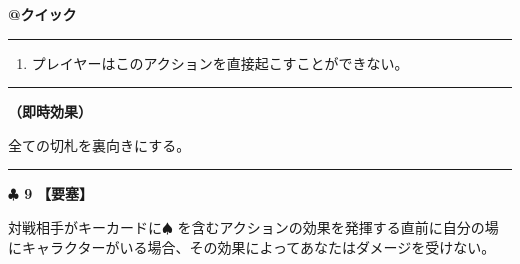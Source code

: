 \documentclass[twocolumn,a5paper,papersize,10pt]{jarticle}
\begin{document}
\vspace{-1zh}
\begin{tcolorbox}[title={\small\bf【Action】切札リセット}{\scriptsize （誘発）}]

{\scriptsize\bf @クイック }

\vspace{1mm} %
\hrule height 0.1mm depth 0mm width 62mm %
\vspace{1mm} %


\vspace{-1zh}%
\begin{enumerate}
\renewcommand{\labelenumi}{※}
\setlength{\leftskip}{-0.3cm}
\setlength{\itemsep}{0pt} %
\setlength{\parskip}{0pt} %

\item プレイヤーはこのアクションを直接起こすことができない。

\vspace{-3mm}%
\end{enumerate}
\vspace{-2mm} %
\vspace{1zh}%
\vspace{1mm} %
\hrule height 0.1mm depth 0mm width 62mm %
\vspace{1mm} %

{\bf（即時効果）}

全ての切札を裏向きにする。

\vspace{1mm} %
\end{tcolorbox}

\vspace{-1zh}
  
 

\vspace{3mm} %
\hrule height 0.5mm depth 0mm width 66.5mm %
\vspace{1mm} %
{\Large\bf $\clubsuit$ 9} {\normalsize\bf【要塞】} %
\vspace{1mm} %

対戦相手がキーカードに{\normalsize $\spadesuit$} を含むアクションの効果を発揮する直前に自分の場にキャラクターがいる場合、その効果によってあなたはダメージを受けない。

 
\end{document}
